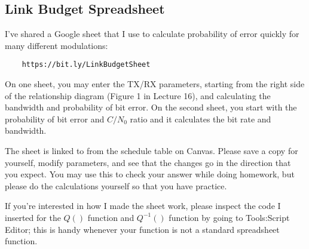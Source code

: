 \subsection{Link Budget Spreadsheet}

I've shared a Google sheet that I use to calculate probability of error quickly for many different modulations:
\begin{verbatim}
    https://bit.ly/LinkBudgetSheet
\end{verbatim}

On one sheet, you may enter the TX/RX parameters, starting from the right side of the relationship diagram (Figure 1 in Lecture 16), and calculating the bandwidth and probability of bit error.  On the second sheet, you start with the probability of bit error and $C/N_0$ ratio and it calculates the bit rate and bandwidth.

The sheet is linked to from the schedule table on Canvas.  Please save a copy for yourself, modify parameters, and see that the changes go in the direction that you expect.  You may use this to check your answer while doing homework, but please do the calculations yourself so that you have practice.  

If you're interested in how I made the sheet work, please inspect the code I inserted for the $Q()$ function and $Q^{-1}()$ function by going to  Tools:Script Editor; this is handy whenever your function is not a standard spreadsheet function.